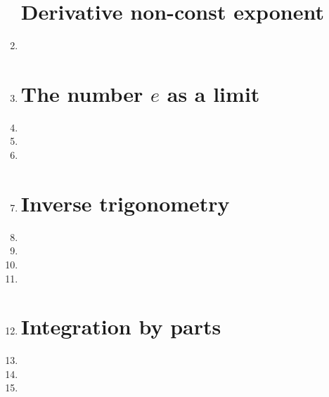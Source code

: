 \documentclass{article}
\begin{document}
\begin{enumerate}
\section{Derivative non-const exponent }
\item 
\item 
\section{The number $e$ as a limit}
\item 
\item 
\item 
\item 
\section{Inverse trigonometry}
\item 

\item 
\item 
 
\item 
\item 

\section{Integration by parts}
\item 

\item 

\item 

\end{enumerate}
\end{document}
